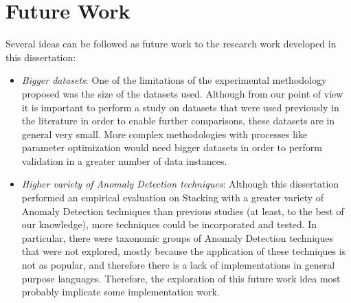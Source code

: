 

\section{Future Work}

Several ideas can be followed as future work to the research work developed in this dissertation:

\begin{itemize}
	\item \textit{Bigger datasets}: One of the limitations of the experimental methodology proposed was the size of the datasets used. Although from our point of view it is important to perform a study on datasets that were used previously in the literature in order to enable further comparisons, these datasets are in general very small.
	More complex methodologies with processes like parameter optimization would need bigger datasets in order to perform validation in a greater number of data instances.
	\item \textit{Higher variety of Anomaly Detection techniques}: Although this dissertation performed an empirical evaluation on Stacking with a greater variety of Anomaly Detection techniques than previous studies (at least, to the best of our knowledge), more techniques could be incorporated and tested.
	In particular, there were taxonomic groups of Anomaly Detection techniques that were not explored, mostly because the application of these techniques is not as popular, and therefore there is a lack of implementations in general purpose languages.
	Therefore, the exploration of this future work idea most probably implicate some implementation work.
\end{itemize}